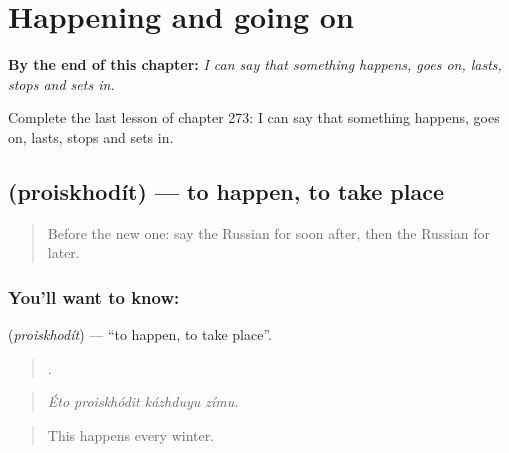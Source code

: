 
\chapter{Happening and going on}
\label{ch:ru-happening-and-going-on}

\begin{chapteropening}
\textbf{By the end of this chapter:} \emph{I can say that something happens, goes on, lasts, stops and sets in.}

Complete the last lesson of chapter 273: I can say that something happens, goes on, lasts, stops and sets in.
\end{chapteropening}

\section[\texorpdfstring{\ru{происходить} (proiskhodít)}{происходить (proiskhodít)}]{ (proiskhodít) — to happen, to take place}

\label{lesson:RU-C273-proiskhodit}



\begin{quote}
Before the new one: say the Russian for soon after, then the Russian for later.
\end{quote}

\subsection*{You'll want to know: }
\textbf{} (\emph{proiskhodít}) — \textquotedblleft{}to happen, to take place\textquotedblright{}.

\begin{quote}
   .
\end{quote}

\begin{quote}
\emph{Éto proiskhódit kázhduyu zímu.}
\end{quote}

\begin{quote}
This happens every winter.
\end{quote}

